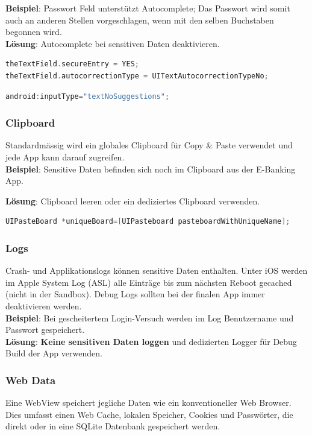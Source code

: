 \textbf{Beispiel}: Passwort Feld unterstützt Autocomplete; Das Passwort wird somit auch an anderen Stellen vorgeschlagen, wenn mit den selben Buchstaben begonnen wird. \\

\textbf{Lösung}: Autocomplete bei sensitiven Daten deaktivieren.
\begin{lstlisting}[language=C, caption=Lösung für iOS]
theTextField.secureEntry = YES;
theTextField.autocorrectionType = UITextAutocorrectionTypeNo;
\end{lstlisting}
\begin{lstlisting}[language=Java, caption=Lösung für Android]
android:inputType="textNoSuggestions";
\end{lstlisting}

\subsubsection{Clipboard}
Standardmässig wird ein globales Clipboard für Copy \& Paste verwendet und jede App kann darauf zugreifen.\\
\textbf{Beispiel}: Sensitive Daten befinden sich noch im Clipboard aus der E-Banking App.

\textbf{Lösung}: Clipboard leeren oder ein dediziertes Clipboard verwenden.
\begin{lstlisting}[language=C, caption=Lösung für iOS]
UIPasteBoard *uniqueBoard=[UIPasteboard pasteboardWithUniqueName];
\end{lstlisting}

\subsubsection{Logs}
Crash- und Applikationslogs können sensitive Daten enthalten. Unter iOS werden im Apple System Log (ASL) alle Einträge bis zum nächsten Reboot gecached (nicht in der Sandbox). Debug Logs sollten bei der finalen App immer deaktivieren werden.\\

\textbf{Beispiel}: Bei gescheitertem Login-Versuch werden im Log Benutzername und Passwort gespeichert.\\

\textbf{Lösung}: \textbf{Keine sensitiven Daten loggen} und dedizierten Logger für Debug Build der App verwenden.

\subsubsection{Web Data}
Eine WebView speichert jegliche Daten wie ein konventioneller Web Browser. Dies umfasst einen Web Cache, lokalen Speicher, Cookies und Passwörter, die direkt oder in eine SQLite Datenbank gespeichert werden. \\

